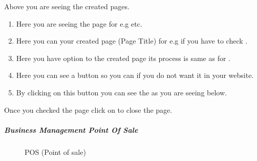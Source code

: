 \documentclass[a4paper,10pt,english]{report}
\begin{document}
Above you are seeing the created pages.
\begin{enumerate}
\def\theenumi{\arabic{enumi}}
\def\labelenumi{\theenumi .}
\makeatletter\def\p@enumii{\p@enumi \theenumi .}\makeatother
\item {} 
Here you are seeing the page  for e.g  etc.

\item {} 
Here you can  your created page  (Page Title) for e.g if you have to check  .

\item {} 
Here you have option to  the created page its process is same as for  .

\item {} 
Here you can see a  button so you can  if you do not want it in your website.

\item {} 
By clicking on this button you can see the  as you are seeing below.

\end{enumerate}

\begin{figure}[htbp]
\centering

\noindent{}
\end{figure}

Once you checked the page click on  to close the page.


\subparagraph{Business Management Point Of Sale}
\label{\detokenize{BMpos:business-management-point-of-sale}}\label{\detokenize{BMpos::doc}}
\begin{figure}[htbp]
\centering
\capstart

\noindent{}
\caption{POS (Point of sale)}\label{\detokenize{BMpos:id4}}\label{\detokenize{BMpos:id1}}\end{figure}
\end{document}
